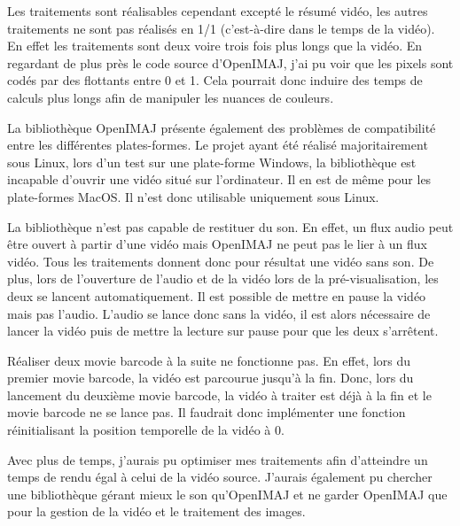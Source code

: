 \documentclass[10pt,a4paper]{article}
\begin{document}
Les traitements sont réalisables cependant excepté le résumé vidéo, les autres traitements ne sont pas réalisés en 1/1 (c'est-à-dire dans le temps de la vidéo). En effet les traitements sont deux voire trois fois plus longs que la vidéo. En regardant de plus près le code source d'OpenIMAJ, j'ai pu voir que les pixels sont codés par des flottants entre  0 et 1. Cela pourrait donc induire des temps de calculs plus longs afin de manipuler les nuances de couleurs.

La bibliothèque OpenIMAJ présente également des problèmes de compatibilité entre les différentes plates-formes. Le projet ayant été réalisé majoritairement sous Linux, lors d'un test sur une plate-forme Windows, la bibliothèque est incapable d'ouvrir une vidéo situé sur l'ordinateur. Il en est de même pour les plate-formes MacOS. Il n'est donc utilisable uniquement sous Linux.

La bibliothèque n'est pas capable de restituer du son. En effet, un flux audio peut être ouvert à partir d'une vidéo mais OpenIMAJ ne peut pas le lier à un flux vidéo. Tous les traitements donnent donc pour résultat une vidéo sans son. De plus, lors de l'ouverture de l'audio et de la vidéo lors de la pré-visualisation, les deux se lancent automatiquement. Il est possible de mettre en pause la vidéo mais pas l'audio. L'audio se lance donc sans la vidéo, il est alors nécessaire de lancer la vidéo puis de mettre la lecture sur pause pour que les deux s'arrêtent.

Réaliser deux movie barcode à la suite ne fonctionne pas. En effet, lors du premier movie barcode, la vidéo est parcourue jusqu'à la fin. Donc, lors du lancement du deuxième movie barcode, la vidéo à traiter est déjà à la fin et le movie barcode ne se lance pas. Il faudrait donc implémenter une fonction réinitialisant la position temporelle de la vidéo à 0.

Avec plus de temps, j'aurais pu optimiser mes traitements afin d'atteindre un temps de rendu égal à celui de la vidéo source. J'aurais également pu chercher une bibliothèque gérant mieux le son qu'OpenIMAJ et ne garder OpenIMAJ que pour la gestion de la vidéo et le traitement des images.

\newpage

\end{document}
